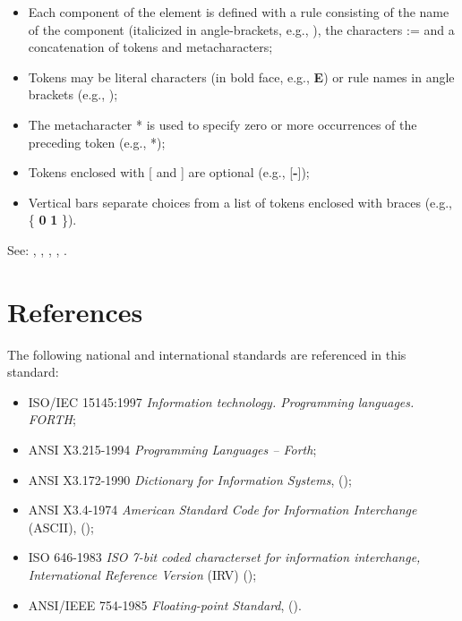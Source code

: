 \begin{itemize}
\item Each component of the element is defined with a rule consisting
	of the name of the component (italicized in angle-brackets,
	e.g., ), the characters \textsf{:=} and a concatenation
	of tokens and metacharacters;

\item Tokens may be literal characters (in bold face, e.g.,
	\textbf{E}) or rule names in angle brackets (e.g.,
	\linebreak {});

\item The metacharacter * is used to specify zero or more occurrences of
	the preceding token (e.g., *);

\item Tokens enclosed with [ and ] are optional (e.g., [\textbf{-}]);

\item Vertical bars separate choices from a list of tokens enclosed
	with braces (e.g., \{ \textbf{0} {\textbar} \textbf{1} \}).
\end{itemize}

See:
	,
	,
	,
	,
	.


\section{References}
\label{notation:references}

The following national and international standards are referenced
in this standard:

\begin{itemize}
\item ISO/IEC 15145:1997 \emph{Information technology.
	Programming languages. FORTH};

\item ANSI X3.215-1994 \emph{Programming Languages -- Forth};

\item ANSI X3.172-1990 \emph{Dictionary for Information Systems},
	();

\item ANSI X3.4-1974 \emph{American Standard Code for Information
	Interchange} (ASCII),
	();

\item ISO 646-1983 \emph{ISO 7-bit coded characterset for
	information interchange, International Reference Version} (IRV)
	();

\item ANSI/IEEE 754-1985 \emph{Floating-point Standard},
	().
\end{itemize}
